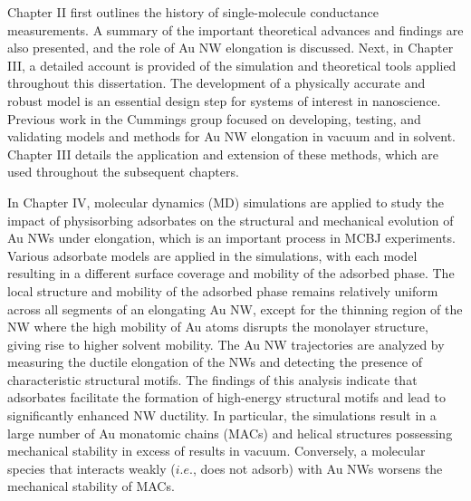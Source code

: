\documentclass[10pt]{report}  %
\begin{document}
Chapter II first outlines the history of single-molecule conductance measurements. A summary of the important theoretical advances and findings are also presented, and the role of Au NW elongation is discussed. Next, in Chapter III, a detailed account is provided of the simulation and theoretical tools applied throughout this dissertation. The development of a physically accurate and robust model is an essential design step for systems of interest in nanoscience. Previous work in the Cummings group focused on developing, testing, and validating models and methods for Au NW elongation in vacuum \cite{Pu_JCP:2007,Pu:2008} and in solvent.\cite{Leng:2005,Leng:2007,Pu:2007,Pu:2010}  Chapter III details the application and extension of these methods, which are used throughout the subsequent chapters.

In Chapter IV, molecular dynamics (MD)  simulations are applied to study the impact of physisorbing adsorbates on the structural and mechanical evolution of Au NWs under elongation, which is an important process in MCBJ experiments. \cite{French:2011} Various adsorbate models are applied in the simulations, with each model resulting in a different surface coverage and mobility of the adsorbed phase. The local structure and mobility of the adsorbed phase remains relatively uniform across all segments of an elongating Au NW, except for the thinning region of the NW where the high mobility of Au atoms disrupts the monolayer structure, giving rise to higher solvent mobility. The Au NW trajectories are analyzed by measuring the ductile elongation of the NWs and detecting the presence of characteristic structural motifs. The findings of this analysis indicate that adsorbates facilitate the formation of high-energy structural motifs and lead to significantly enhanced NW ductility.  In particular, the simulations result in a large number of Au monatomic chains (MACs)\cite{Pu:2008}  and helical structures possessing mechanical stability in excess of results in vacuum.  Conversely, a molecular species that interacts weakly ($i.e.$, does not adsorb) with Au NWs worsens the mechanical stability of MACs.
\end{document}
